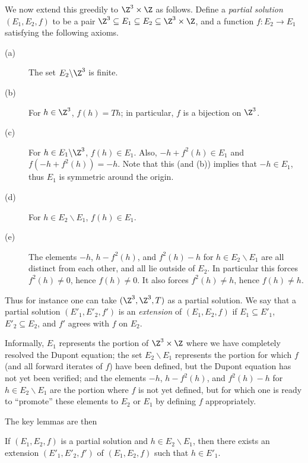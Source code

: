 We now extend this greedily to $\Z^3 \times \Z$ as follows.  Define a \emph{partial solution} $(E_1,E_2,f)$ to be a pair $\Z^3 \subseteq E_1 \subseteq E_2 \subseteq \Z^3 \times \Z$, and a function $f: E_2 \to E_1$ satisfying the following axioms.
\begin{description}
  \item[(a)] The set $E_2 \backslash \Z^3$ is finite.
  \item[(b)] For $h \in \Z^3$, $f(h) = Th$; in particular, $f$ is a bijection on $\Z^3$.
  \item[(c)] For $h \in E_1 \backslash \Z^3$, $f(h) \in E_1$.  Also, $-h + f^2(h) \in E_1$ and $f(-h + f^2(h)) = -h$. Note that this (and (b)) implies that $-h \in E_1$, thus $E_1$ is symmetric around the origin.
  \item[(d)] For $h \in E_2 \backslash E_1$, $f(h) \in E_1$.
  \item[(e)] The elements $-h$, $h - f^2(h)$, and $f^2(h) - h$ for $h \in E_2 \backslash E_1$ are all distinct from each other, and all lie outside of $E_2$.  In particular this forces $f^2(h) \neq 0$, hence $f(h) \neq 0$. It also forces $f^2(h) \neq h$, hence $f(h) \neq h$.
\end{description}
Thus for instance one can take $(\Z^3,\Z^3,T)$ as a partial solution.  We say that a partial solution $(E'_1, E'_2, f')$ is an \emph{extension} of $(E_1,E_2,f)$ if $E_1 \subseteq E'_1$, $E'_2 \subseteq E_2$, and $f'$ agrees with $f$ on $E_2$.

Informally, $E_1$ represents the portion of $\Z^3 \times \Z$ where we have completely resolved the Dupont equation; the set $E_2 \backslash E_1$ represents the portion for which $f$ (and all forward iterates of $f$) have been defined, but the Dupont equation has not yet been verified; and the elements $-h$, $h - f^2(h)$, and $f^2(h) - h$ for $h \in E_2 \backslash E_1$ are the portion where $f$ is not yet defined, but for which one is ready to ``promote'' these elements to $E_2$ or $E_1$ by defining $f$ appropriately.

The key lemmas are then

\begin{lemma}[Promoting to $E_1$]\label{add-E1}  If $(E_1,E_2,f)$ is a partial solution and $h \in E_2 \backslash E_1$, then there exists an extension $(E'_1,E'_2,f')$ of $(E_1,E_2,f)$ such that $h \in E'_1$.
\end{lemma}

